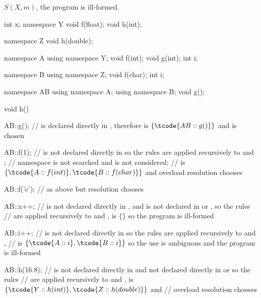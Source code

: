 $S(X, m)$, the program is ill-formed. \begin{example}

\begin{codeblock}
int x;
namespace Y {
  void f(float);
  void h(int);
}

namespace Z {
  void h(double);
}

namespace A {
  using namespace Y;
  void f(int);
  void g(int);
  int i;
}

namespace B {
  using namespace Z;
  void f(char);
  int i;
}

namespace AB {
  using namespace A;
  using namespace B;
  void g();
}

void h()
{
  AB::g();          //  is declared directly in , therefore  is $\{ \tcode{AB::g()} \}$ and  is chosen

  AB::f(1);         //  is not declared directly in  so the rules are applied recursively to  and ;
                    // namespace  is not searched and  is not considered;
                    //  is $\{ \tcode{A::f(int)}, \tcode{B::f(char)} \}$ and overload resolution chooses 

  AB::f('c');       // as above but resolution chooses 

  AB::x++;          //  is not declared directly in , and is not declared in  or , so the rules
                    // are applied recursively to  and ,  is $\{ \}$ so the program is ill-formed

  AB::i++;          //  is not declared directly in  so the rules are applied recursively to  and ,
                    //  is $\{ \tcode{A::i}, \tcode{B::i} \}$ so the use is ambiguous and the program is ill-formed

  AB::h(16.8);      //  is not declared directly in  and not declared directly in  or  so the rules
                    // are applied recursively to  and ,  is $\{ \tcode{Y::h(int)}, \tcode{Z::h(double)} \}$ and
                    // overload resolution chooses 
}
\end{codeblock}
\end{example}


